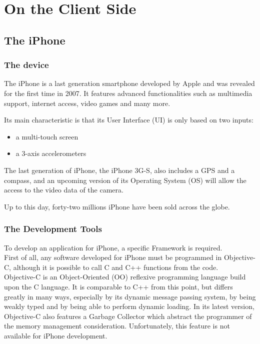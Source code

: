 \chapter{On the Client Side}
\label{cha:on_the_client_side}

\section{The iPhone}
\label{sec:the_iphone}

\subsection{The device}
The iPhone is a last generation smartphone developed by Apple and was revealed for the first time in 2007. It features advanced functionalities such as multimedia support, internet access, video games and many more.

Its main characteristic is that its User Interface (UI) is only based on two inputs:

\begin{itemize}
\item{a multi-touch screen}
\item{a 3-axis accelerometers}
\end{itemize}

The last generation of iPhone, the iPhone 3G-S, also includes a GPS and a compass, and an upcoming version of its Operating System (OS) will allow the access to the video data of the camera.

Up to this day, forty-two millions iPhone have been sold across the globe.

\subsection{The Development Tools}

To develop an application for iPhone, a specific Framework is required.\\

First of all, any software developed for iPhone must be programmed in Objective-C, although it is possible to call C and C++ functions from the code.\\

Objective-C is an Object-Oriented (OO) reflexive programming language build upon the C language. It is comparable to C++ from this point, but differs greatly in many ways, especially by its dynamic message passing system, by being weakly typed and by being able to perform dynamic loading. In its latest version, Objective-C also features a Garbage Collector which abstract the programmer of the memory management consideration. Unfortunately, this feature is not available for iPhone development.\\

